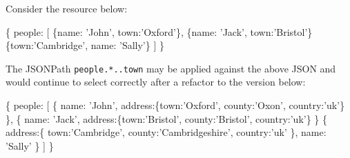 \documentclass[12pt, ]{article}
\newenvironment{Shaded}{}{}
\newcommand{\DataTypeTok}[1]{\textcolor[rgb]{0.56,0.13,0.00}{{#1}}}
\newcommand{\StringTok}[1]{\textcolor[rgb]{0.25,0.44,0.63}{{#1}}}
\newcommand{\NormalTok}[1]{{#1}}
\begin{document}
Consider the resource below:

\begin{Shaded}
\begin{Highlighting}[]
\NormalTok{\{}
   \DataTypeTok{people}\NormalTok{: [}
      \NormalTok{\{}\DataTypeTok{name}\NormalTok{: }\StringTok{'John'}\NormalTok{, }\DataTypeTok{town}\NormalTok{:}\StringTok{'Oxford'}\NormalTok{\},}
      \NormalTok{\{}\DataTypeTok{name}\NormalTok{: }\StringTok{'Jack'}\NormalTok{, }\DataTypeTok{town}\NormalTok{:}\StringTok{'Bristol'}\NormalTok{\}}
      \NormalTok{\{}\DataTypeTok{town}\NormalTok{:}\StringTok{'Cambridge'}\NormalTok{, }\DataTypeTok{name}\NormalTok{: }\StringTok{'Sally'}\NormalTok{\}}
   \NormalTok{]}
\NormalTok{\}}
\end{Highlighting}
\end{Shaded}

The JSONPath \texttt{people.*..town} may be applied against the above
JSON and would continue to select correctly after a refactor to the
version below:

\begin{Shaded}
\begin{Highlighting}[]
\NormalTok{\{}
   \DataTypeTok{people}\NormalTok{: [}
      \NormalTok{\{  }\DataTypeTok{name}\NormalTok{: }\StringTok{'John'}\NormalTok{, }
         \DataTypeTok{address}\NormalTok{:\{}\DataTypeTok{town}\NormalTok{:}\StringTok{'Oxford'}\NormalTok{, }\DataTypeTok{county}\NormalTok{:}\StringTok{'Oxon'}\NormalTok{, }\DataTypeTok{country}\NormalTok{:}\StringTok{'uk'}\NormalTok{\}}
      \NormalTok{\},}
      \NormalTok{\{  }\DataTypeTok{name}\NormalTok{: }\StringTok{'Jack'}\NormalTok{,}
         \DataTypeTok{address}\NormalTok{:\{}\DataTypeTok{town}\NormalTok{:}\StringTok{'Bristol'}\NormalTok{, }\DataTypeTok{county}\NormalTok{:}\StringTok{'Bristol'}\NormalTok{, }\DataTypeTok{country}\NormalTok{:}\StringTok{'uk'}\NormalTok{\}}
      \NormalTok{\}}
      \NormalTok{\{  }\DataTypeTok{address}\NormalTok{:\{}
            \DataTypeTok{town}\NormalTok{:}\StringTok{'Cambridge'}\NormalTok{, }\DataTypeTok{county}\NormalTok{:}\StringTok{'Cambridgeshire'}\NormalTok{, }
            \DataTypeTok{country}\NormalTok{:}\StringTok{'uk'}
         \NormalTok{\},}
         \DataTypeTok{name}\NormalTok{: }\StringTok{'Sally'}
      \NormalTok{\}}
   \NormalTok{]}
\NormalTok{\}}
\end{Highlighting}
\end{Shaded}
\end{document}
